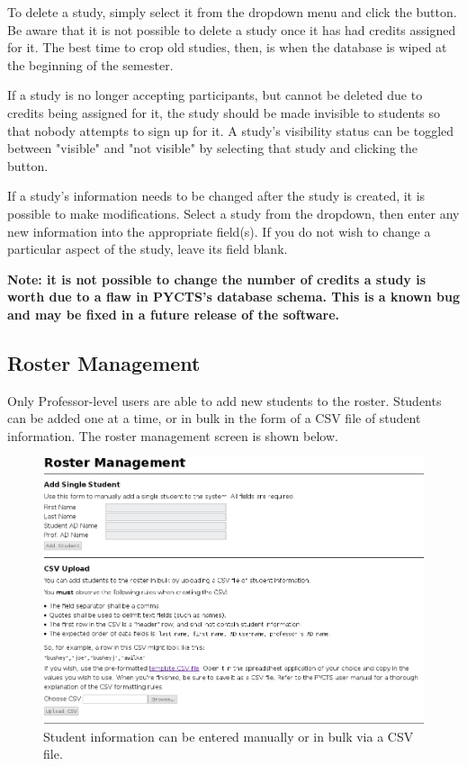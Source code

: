\documentclass[letterpaper,titlepage]{article}
\begin{document}
To delete a study, simply select it from the dropdown menu and click the button. Be aware that it is not possible to delete a study once it has had credits assigned for it. The best time to crop old studies, then, is when the database is wiped at the beginning of the semester.

If a study is no longer accepting participants, but cannot be deleted due to credits being assigned for it, the study should be made invisible to students so that nobody attempts to sign up for it. A study's visibility status can be toggled between "visible" and "not visible" by selecting that study and clicking the button.

If a study's information needs to be changed after the study is created, it is possible to make modifications. Select a study from the dropdown, then enter any new information into the appropriate field(s). If you do not wish to change a particular aspect of the study, leave its field blank.

\textbf{Note: it is not possible to change the number of credits a study is worth due to a flaw in PYCTS's database schema. This is a known bug and may be fixed in a future release of the software.}

\newpage
\subsection{Roster Management}
Only Professor-level users are able to add new students to the roster. Students can be added one at a time, or in bulk in the form of a CSV file of student information. The roster management screen is shown below.

\begin{figure}[H]
\includegraphics[width=\textwidth]{images/prof_students.png}
\caption{Student information can be entered manually or in bulk via a CSV file.}
\label{prof_students}
\end{figure}
\end{document}
